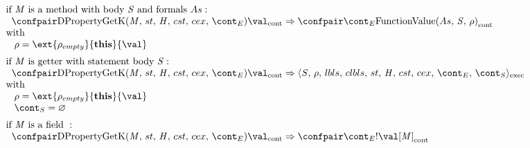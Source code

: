 \documentclass{article}
\renewcommand{\emptyset}{\varnothing}
\newcommand{\cesktrans}[2]{\ensuremath{{#1} \Rightarrow {#2}}}
\begin{document}
\[
  \begin{array}{lcl@{\hspace{30mm}}}
	\textrm{if }\membermeta \textrm{ is a method with body }\stmt\textrm{ and formals }\formals :\\
	\hspace{2mm}
	\cesktrans{
		\contconf{\DPropertyGetK}{\val}}{
		\contconf{\econt}{\funval{\formals}{\stmt}{\env}}}\\
	\textrm{with}\\
	\hspace{3mm}
	\env = \ext{\env_{empty}}{\mathbf{this}}{\val}\\[2mm]

	\textrm{if }\membermeta \textrm{ is getter with statement body }\stmt :\\
	\hspace{2mm}
	\cesktrans{
		\contconf{\DPropertyGetK}{\val}}{
		\execconf{\stmt}{\env}{\lbls}{\clbls}{\handler}{\cstrace}{\cex}{\econt}{\scont}}
		\\
	\textrm{with}\\
	\hspace{3mm}
	\env = \ext{\env_{empty}}{\mathbf{this}}{\val}\\
	\hspace{3mm}
	\scont = \emptyset\\[2mm]

	\textrm{if }\membermeta \textrm{ is a field } :\\
	\hspace{2mm}\cesktrans{
		\contconf{\DPropertyGetK}{\val}}{
		\contconf{\econt}{\deref{\val[\membermeta]}}}\\
  \end{array}
\]
\end{document}
